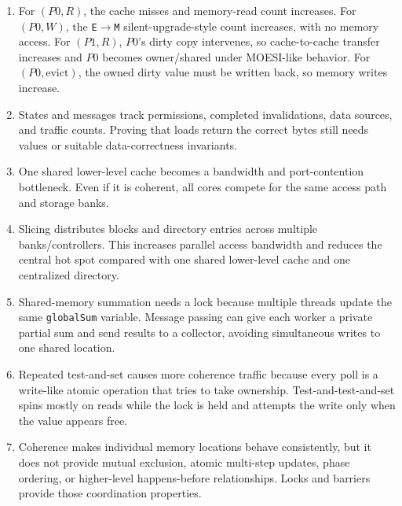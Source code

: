 \documentclass[11pt]{article}
\begin{document}
\begin{enumerate}
    \item For \((P0,R)\), the cache misses and memory-read count increases.
    For \((P0,W)\), the \texttt{E}\(\rightarrow\)\texttt{M} silent-upgrade-style count increases, with no memory access.
    For \((P1,R)\), \(P0\)'s dirty copy intervenes, so cache-to-cache transfer increases and \(P0\) becomes owner/shared under MOESI-like behavior.
    For \((P0,\text{evict})\), the owned dirty value must be written back, so memory writes increase.

    \item States and messages track permissions, completed invalidations, data sources, and traffic counts.
    Proving that loads return the correct bytes still needs values or suitable data-correctness invariants.

    \item One shared lower-level cache becomes a bandwidth and port-contention bottleneck.
    Even if it is coherent, all cores compete for the same access path and storage banks.

    \item Slicing distributes blocks and directory entries across multiple banks/controllers.
    This increases parallel access bandwidth and reduces the central hot spot compared with one shared lower-level cache and one centralized directory.

    \item Shared-memory summation needs a lock because multiple threads update the same \texttt{globalSum} variable.
    Message passing can give each worker a private partial sum and send results to a collector, avoiding simultaneous writes to one shared location.

    \item Repeated test-and-set causes more coherence traffic because every poll is a write-like atomic operation that tries to take ownership.
    Test-and-test-and-set spins mostly on reads while the lock is held and attempts the write only when the value appears free.

    \item Coherence makes individual memory locations behave consistently, but it does not provide mutual exclusion, atomic multi-step updates, phase ordering, or higher-level happens-before relationships.
    Locks and barriers provide those coordination properties.
\end{enumerate}
\end{document}
